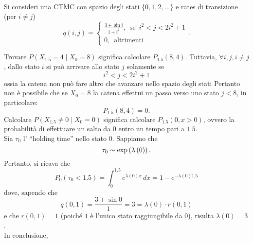 \documentclass[11pt,largemargins]{homework}
\begin{document}
\section{}%
Si consideri una CTMC con spazio degli stati $\{0,1,2,...\}$ e rates di transizione (per $i\neq j$)
\begin{equation*}
q\left(i,j\right)=\begin{cases}\frac{3+\sin{i}}{1+i^{2}},\,\,\,\text{se}\,\,\,i^{2}<j<2i^{2}+1\\0, \,\,\,\text{altrimenti}\end{cases}.
\end{equation*}
\begin{alphaparts}
\questionpart
Trovare $P\left(X_{1.5}=4 \mid X_{0}=8\right)$ significa calcolare $P_{1.5}\left(8,4\right)$. Tuttavia, $\forall i,j, i\neq j$, dallo stato $i$ si può arrivare allo stato $j$ solamente se 
\begin{equation*}
i^2<j<2i^{2}+1
\end{equation*}
ossia la catena non può fare altro che avanzare nello spazio degli stati Pertanto non è possibile che se \(X_0 = 8\) la catena effettui un passo verso uno stato \(j<8\), in particolare:
\begin{equation*}
P_{1.5}\left(8,4\right)=0.
\end{equation*}
\questionpart
Calcolare $P\left(X_{1.5}\neq 0 \mid X_{0}=0\right)$ significa calcolare $P_{1.5}\left(0,x>0\right)$, ovvero la probabilità di effettuare un salto da $0$ entro un tempo pari a $1.5$.\\
Sia $\tau_{0}$ l' ``holding time'' nello stato $0$. Sappiamo che
\begin{equation*}
\tau_{0}\thicksim \text{exp}\left(\lambda\left(0\right)\right).
\end{equation*}
Pertanto, si ricava che
\begin{equation*}
P_{0}\left(\tau_{0}<1.5\right)=\int_{0}^{1.5} e^{\lambda\left(0\right)x} \,dx= 1 - e^{-\lambda\left(0\right)1.5}
\end{equation*}
dove, sapendo che
\begin{equation*}
q\left(0,1\right)=\frac{3+\sin{0}}{1}=3=\lambda\left(0\right)\cdot r\left(0,1\right)
\end{equation*}
e che $r\left(0,1\right)=1$ (poiché $1$ è l'unico stato raggiungibile da $0$), risulta $\lambda\left(0\right)=3$.\\
In conclusione,
\begin{equation*}

\end{equation*}
\end{alphaparts}
\end{document}
